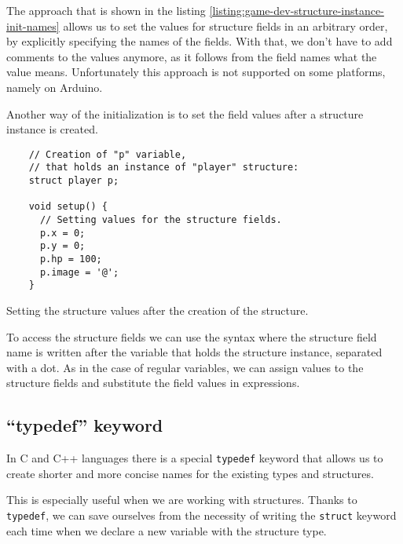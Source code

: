 \documentclass[../sparc.tex]{subfiles}
\begin{document}
The approach that is shown in the listing
\ref{listing:game-dev-structure-instance-init-names} allows us to set the values
for structure fields in an arbitrary order, by explicitly specifying the names
of the fields.  With that, we don't have to add comments to the values anymore,
as it follows from the field names what the value means.  Unfortunately this
approach is not supported on some platforms, namely on Arduino.

Another way of the initialization is to set the field values after a structure
instance is created.

\begin{listing}[H]
  \begin{verbatim}
    // Creation of "p" variable,
    // that holds an instance of "player" structure:
    struct player p;

    void setup() {
      // Setting values for the structure fields.
      p.x = 0;
      p.y = 0;
      p.hp = 100;
      p.image = '@';
    }
  \end{verbatim}
  \caption{Setting the structure values after the creation of the structure.}
  \label{listing:game-dev-structure-assignment}
\end{listing}

To access the structure fields we can use the syntax where the structure field
name is written after the variable that holds the structure instance, separated
with a dot.  As in the case of regular variables, we can assign values to the
structure fields and substitute the field values in expressions.

\subsection{``typedef'' keyword}

In C and C++ languages there is a special \texttt{typedef} keyword that
allows us to create shorter and more concise names for the existing types and
structures.

This is especially useful when we are working with structures.  Thanks to
\texttt{typedef}, we can save ourselves from the necessity of writing
the \texttt{struct} keyword each time when we declare a new variable
with the structure type.
\end{document}
